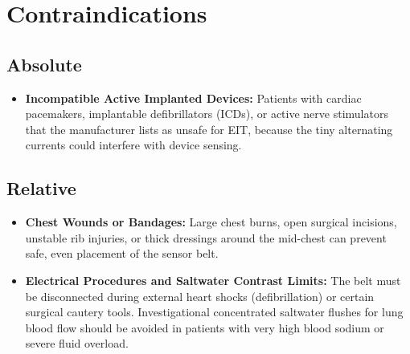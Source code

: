 \section{Contraindications}

\subsection{Absolute}
\begin{itemize}
    \item \textbf{Incompatible Active Implanted Devices:} Patients with cardiac pacemakers, implantable defibrillators (ICDs), or active nerve stimulators that the manufacturer lists as unsafe for EIT, because the tiny alternating currents could interfere with device sensing.
\end{itemize}

\subsection{Relative}
\begin{itemize}
    \item \textbf{Chest Wounds or Bandages:} Large chest burns, open surgical incisions, unstable rib injuries, or thick dressings around the mid-chest can prevent safe, even placement of the sensor belt.
    \item \textbf{Electrical Procedures and Saltwater Contrast Limits:} The belt must be disconnected during external heart shocks (defibrillation) or certain surgical cautery tools. Investigational concentrated saltwater flushes for lung blood flow should be avoided in patients with very high blood sodium or severe fluid overload.
\end{itemize}

